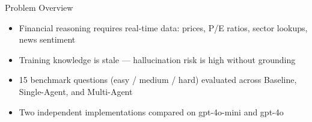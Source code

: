 \documentclass[aspectratio=169]{beamer}
\begin{document}
\begin{frame}[plain]
    \vfill
    \begin{center}
    \end{center}
    \vfill
\end{frame}

\begin{frame}{Problem Overview}
    \begin{center}
    \end{center}
    \begin{itemize}
        \item<2-> Financial reasoning requires real-time data: prices, P/E ratios, sector lookups, news sentiment
        \item<3-> Training knowledge is stale --- hallucination risk is high without grounding
        \item<4-> 15 benchmark questions (easy / medium / hard) evaluated across Baseline, Single-Agent, and Multi-Agent
        \item<5-> Two independent implementations compared on gpt-4o-mini and gpt-4o
    \end{itemize}
\end{frame}
\end{document}
